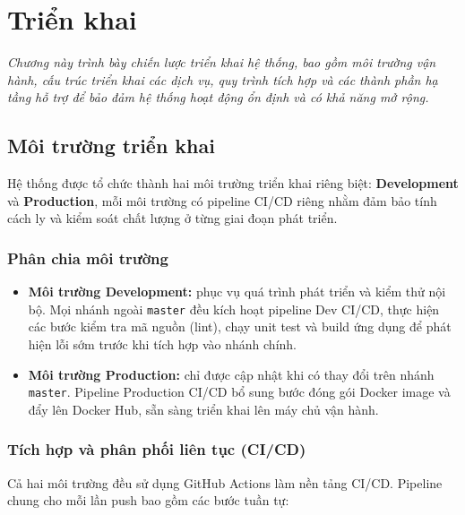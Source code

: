 \chapter{Triển khai}
\textit{Chương này trình bày chiến lược triển khai hệ thống, bao gồm môi trường vận hành, cấu trúc triển khai các dịch vụ, quy trình tích hợp và các thành phần hạ tầng hỗ trợ để bảo đảm hệ thống hoạt động ổn định và có khả năng mở rộng.}

\section{Môi trường triển khai}

Hệ thống được tổ chức thành hai môi trường triển khai riêng biệt: \textbf{Development} và \textbf{Production}, mỗi môi trường có pipeline CI/CD riêng nhằm đảm bảo tính cách ly và kiểm soát chất lượng ở từng giai đoạn phát triển.

\subsection{Phân chia môi trường}

\begin{itemize}
    \item \textbf{Môi trường Development:} phục vụ quá trình phát triển và kiểm thử nội bộ. Mọi nhánh ngoài \texttt{master} đều kích hoạt pipeline Dev CI/CD, thực hiện các bước kiểm tra mã nguồn (lint), chạy unit test và build ứng dụng để phát hiện lỗi sớm trước khi tích hợp vào nhánh chính.
    \item \textbf{Môi trường Production:} chỉ được cập nhật khi có thay đổi trên nhánh \texttt{master}. Pipeline Production CI/CD bổ sung bước đóng gói Docker image và đẩy lên Docker Hub, sẵn sàng triển khai lên máy chủ vận hành.
\end{itemize}

\subsection{Tích hợp và phân phối liên tục (CI/CD)}

Cả hai môi trường đều sử dụng GitHub Actions \cite{github_actions} làm nền tảng CI/CD. Pipeline chung cho mỗi lần push bao gồm các bước tuần tự:

